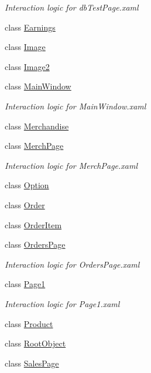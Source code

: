 \begin{DoxyCompactItemize}
\begin{DoxyCompactList}\small\item\em Interaction logic for db\+Test\+Page.\+xaml \end{DoxyCompactList}\item 
class \mbox{\hyperlink{class_nexus_1_1_earnings}{Earnings}}
\item 
class \mbox{\hyperlink{class_nexus_1_1_image}{Image}}
\item 
class \mbox{\hyperlink{class_nexus_1_1_image2}{Image2}}
\item 
class \mbox{\hyperlink{class_nexus_1_1_main_window}{Main\+Window}}
\begin{DoxyCompactList}\small\item\em Interaction logic for Main\+Window.\+xaml \end{DoxyCompactList}\item 
class \mbox{\hyperlink{class_nexus_1_1_merchandise}{Merchandise}}
\item 
class \mbox{\hyperlink{class_nexus_1_1_merch_page}{Merch\+Page}}
\begin{DoxyCompactList}\small\item\em Interaction logic for Merch\+Page.\+xaml \end{DoxyCompactList}\item 
class \mbox{\hyperlink{class_nexus_1_1_option}{Option}}
\item 
class \mbox{\hyperlink{class_nexus_1_1_order}{Order}}
\item 
class \mbox{\hyperlink{class_nexus_1_1_order_item}{Order\+Item}}
\item 
class \mbox{\hyperlink{class_nexus_1_1_orders_page}{Orders\+Page}}
\begin{DoxyCompactList}\small\item\em Interaction logic for Orders\+Page.\+xaml \end{DoxyCompactList}\item 
class \mbox{\hyperlink{class_nexus_1_1_page1}{Page1}}
\begin{DoxyCompactList}\small\item\em Interaction logic for Page1.\+xaml \end{DoxyCompactList}\item 
class \mbox{\hyperlink{class_nexus_1_1_product}{Product}}
\item 
class \mbox{\hyperlink{class_nexus_1_1_root_object}{Root\+Object}}
\item 
class \mbox{\hyperlink{class_nexus_1_1_sales_page}{Sales\+Page}}

\end{DoxyCompactItemize}
